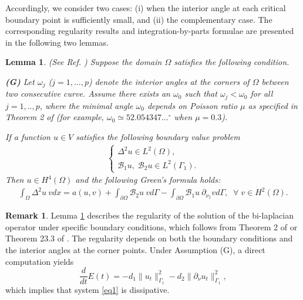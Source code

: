 \documentclass[twoside]{article}
\newtheorem{lemma}[definition]{Lemma}
\theoremstyle{noparens}
\theoremstyle{definition}
\newtheorem{remark}[definition]{Remark}
\numberwithin{equation}{section}
\numberwithin{figure}{section}
\begin{document}
Accordingly, we  consider two cases: (i) when the interior angle at each critical boundary point is sufficiently small, and (ii)  the complementary case. The corresponding regularity results and integration-by-parts formulae are presented in the following two lemmas.

\medskip

\begin{lemma} \label{Le2.2} (See Ref. \cite{blum, dauge}) Suppose   the domain $\Omega$ satisfies  the following  condition.
	
	{\bf   (G)  } Let $\omega_j$ ($j=1,...,p$) denote the interior
	angles at the corners of $\Omega$ between two consecutive curve. Assume there exists an  $\omega_0$ such that $\omega_j<\omega_0$ for all $j=1,..,p$, where
	the minimal angle $\omega_0$ depends on Poisson ratio $\mu$ as specified in Theorem 2 of \cite{blum} (for example,
	$\omega_0\simeq52.054347...^\circ$ when $\mu = 0.3$).
	
	If  a function $u\in V$ satisfies the
	following   boundary value problem
	\begin{align}
		\label{am2} 
		\begin{cases}
			\Delta^2 u  \in L^2(\Omega),\\
			\mathcal B_1u,\;  \mathcal B_2 u \in L^2(\Gamma_1).
		\end{cases}
	\end{align}
	Then $u\in H^4(\Omega)$ and the following Green's  formula holds:
	\begin{align}
		\label{green} \int_{\Omega}\Delta^{2}u \:  v dx =  a(u,
		v ) +\int_{\partial\Omega}\mathcal B_{2}u\:  v d\Gamma -
		\int_{\partial\Omega}\mathcal B_{1}u\: \partial_{\nu_1} v  d\Gamma,  \;\;
		\forall\;  v \in H^{2}(\Omega).
	\end{align}
\end{lemma}

\medskip

\begin{remark}
	Lemma \ref{Le2.2}   describes  the regularity of the
	solution of the bi-laplacian operator under specific boundary conditions, which follows from Theorem 2 of \cite{blum} or Theorem 23.3 of \cite{dauge}.
	The regularity depends on both the boundary conditions and the interior angles at the corner points.
	Under Assumption (G), a direct computation yields
	$$
	\frac{d}{dt}E(t)
	=-d_1\|u_{t}\|_{\Gamma_{1}}^{2}
	-d_2\|\partial_{\nu}u_{t}\|_{\Gamma_{1}}^{2},$$
	which implies that system \eqref{eq1}  is dissipative.
\end{remark}
\end{document}
